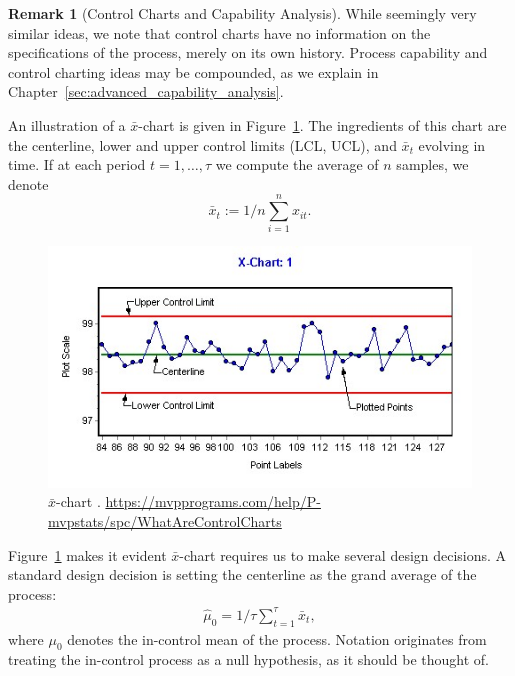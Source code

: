 \documentclass[12pt,a4paper]{report}
\theoremstyle{plain}
\theoremstyle{definition}
\newtheorem{remark}{Remark}
\newcommand{\barxChart}{$\bar{x}$-chart }
\begin{document}
\begin{remark}[Control Charts and Capability Analysis]
While seemingly very similar ideas, we note that control charts have no information on the specifications of the process, merely on its own history.
Process capability and control charting ideas may be compounded, as we explain in Chapter~\ref{sec:advanced_capability_analysis}.
\end{remark}


An illustration of a \barxChart is given in Figure~\ref{fig:bar_x_chart}. 
The ingredients of this chart are the centerline, lower and upper control limits (LCL, UCL), and $\bar{x}_t$ evolving in time. 
If at each period $t=1,\dots,\tau$ we compute the average of $n$ samples, we denote $$\bar{x}_t:=1/n \sum_{i=1}^n x_{it}.$$

\begin{figure}[ht]
\centering
\includegraphics[height=0.3\textheight]{art/X-chartExample}
\caption[\barxChart]{\barxChart. \newline \url{https://mvpprograms.com/help/P-mvpstats/spc/WhatAreControlCharts}}
\label{fig:bar_x_chart}
\end{figure}



Figure~\ref{fig:bar_x_chart} makes it evident \barxChart requires us to make several design decisions.
A standard design decision is setting the centerline as the grand average of the process: 
\begin{align}
\label{eq:centerline}
	\hat{\mu}_0=1/\tau \sum_{t=1}^\tau \bar{x}_t,
\end{align}
where $\mu_0$ denotes the in-control mean of the process. 
Notation originates from treating the in-control process as a null hypothesis, as it should be thought of.
\end{document}
